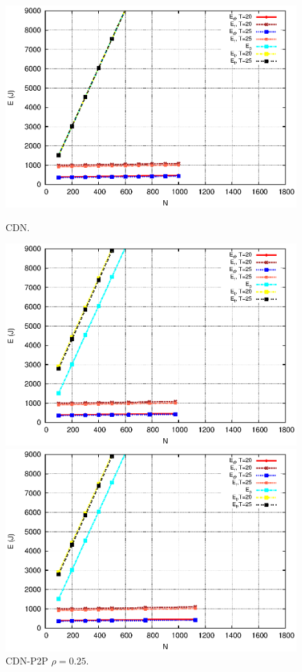 \documentclass[JIP]{ipsj}
\begin{document}
\begin{figure}[t]
\centering
\begin{minipage}[b]{0.3\linewidth}
	\includegraphics[scale=0.5]{graphs/cdn.eps}
	\caption{CDN.}
	\label{fig:4-0}
\end{minipage}
\hfill
\begin{minipage}[b]{0.3\linewidth}
	\includegraphics[scale=0.5]{graphs/cdnp2p-1.eps}
	\caption{CDN-P2P $\rho=0.25$.}
	\label{fig:4-1}
\end{minipage}
\hfill
\begin{minipage}[b]{0.3\linewidth}
	\includegraphics[scale=0.5]{graphs/cdnp2p-2.eps}

\end{minipage}
\end{figure}
\end{document}
